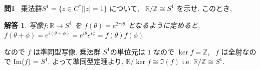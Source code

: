 \documentclass[dvipdfmx]{jsarticle}
\newtheorem*{answer*}{解答}
\begin{document}
{\bf 問1} \ 乗法群$S^1 = \{z \in C^* | |z| = 1 \}$ について, \  $\mathbb{R}/\mathbb{Z} \cong S^1$ を示せ.
このとき, \ 
\begin{answer*}
写像$f : \mathbb{R} \to S^1$ を $f(\theta) = e^{2\pi i\theta}$ となるように定めると, \  
$f(\theta +\phi)
=e^{i(\theta+\phi)}
=e^{i\theta}e^{i\phi}
=f(\theta)f(\phi)$
\end{answer*}
なので $f$ は準同型写像. 乗法群 $S^1$の単位元は $1$ なので $\ker f = \mathbb{Z}$, \ $f$ は全射なので Im($f$) = $S^1$. よって準同型定理より, $\mathbb{R}/\ker f \cong \Im(f)$ i.e. 
$\mathbb{R}/\mathbb{Z} \cong S^1$.
\end{document}
